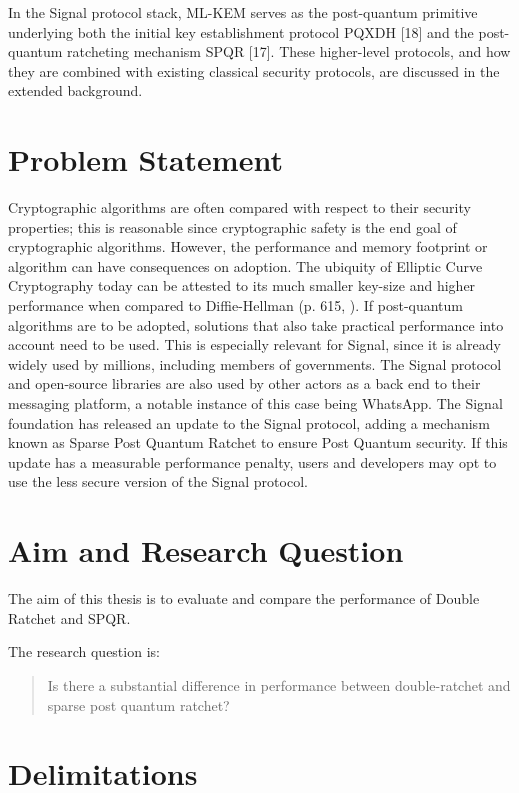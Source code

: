 In the Signal protocol stack, ML-KEM serves as the post-quantum primitive underlying both the initial key establishment protocol PQXDH [18] and the post-quantum ratcheting mechanism SPQR [17]. These higher-level protocols, and how they are combined with existing classical security protocols, are discussed in the extended background. 

\section{Problem Statement}

Cryptographic algorithms are often compared with respect to their security properties; this is reasonable since cryptographic safety is the end goal of cryptographic algorithms. However, the performance and memory footprint or algorithm can have consequences on adoption. The ubiquity of Elliptic Curve Cryptography today can be attested to its much smaller key-size and higher performance when compared to Diffie-Hellman (p. 615, \cite{ref08}). If post-quantum algorithms are to be adopted, solutions that also take practical performance into account need to be used. This is especially relevant for Signal, since it is already widely used by millions, including members of governments. The Signal protocol and open-source libraries are also used by other actors as a back end to their messaging platform, a notable instance of this case being WhatsApp. The Signal foundation has released an update to the Signal protocol, adding a mechanism known as Sparse Post Quantum Ratchet to ensure Post Quantum security. If this update has a measurable performance penalty, users and developers may opt to use the less secure version of the Signal protocol. 

\section{Aim and Research Question}

The aim of this thesis is to evaluate and compare the performance of Double Ratchet and SPQR. 

The research question is: 

\begin{quote}
Is there a substantial difference in performance between double-ratchet and sparse post quantum ratchet?
\end{quote}

\section{Delimitations}

